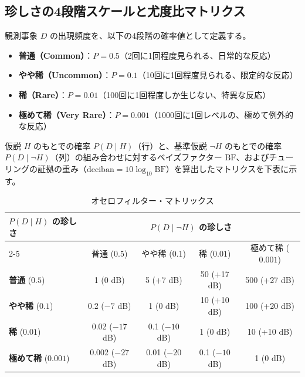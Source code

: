 \subsection{珍しさの4段階スケールと尤度比マトリクス}

観測事象 $D$ の出現頻度を、以下の4段階の確率値として定義する。
\begin{itemize}
\item \textbf{普通（Common）}：$P = 0.5$（2回に1回程度見られる、日常的な反応）
\item \textbf{やや稀（Uncommon）}：$P = 0.1$（10回に1回程度見られる、限定的な反応）
\item \textbf{稀（Rare）}：$P = 0.01$（100回に1回程度しか生じない、特異な反応）
\item \textbf{極めて稀（Very Rare）}：$P = 0.001$（1000回に1回レベルの、極めて例外的な反応）
\end{itemize}

仮説 $H$ のもとでの確率 $P(D \mid H)$（行）と、基準仮説 $\neg H$ のもとでの確率 $P(D \mid \neg H)$（列）の組み合わせに対するベイズファクター $\mathrm{BF}$、およびチューリングの証拠の重み（$\text{deciban} = 10 \log_{10} \mathrm{BF}$）を算出したマトリクスを下表に示す。
\begin{table}
  \centering
  \caption{オセロフィルター・マトリックス}
  \label{tab:othello_filter_matrix}
  \begin{tabular}{lcccc}
    \hline
    \multirow{2}{*}{$P(D \mid H)$ の珍しさ} & \multicolumn{4}{c}{$P(D \mid \neg H)$ の珍しさ} \\
    \cline{2-5}
    & 普通 ($0.5$) & やや稀 ($0.1$) & 稀 ($0.01$) & 極めて稀 ($0.001$) \\
    \hline
    \textbf{普通} ($0.5$)        & 1 (0 dB)       & 5 (+7 dB)     & 50 (+17 dB)  & 500 (+27 dB) \\
    \textbf{やや稀} ($0.1$)      & 0.2 ($-7$ dB)  & 1 (0 dB)      & 10 (+10 dB)  & 100 (+20 dB) \\
    \textbf{稀} ($0.01$)        & 0.02 ($-17$ dB) & 0.1 ($-10$ dB) & 1 (0 dB)     & 10 (+10 dB)  \\
    \textbf{極めて稀} ($0.001$)  & 0.002 ($-27$ dB) & 0.01 ($-20$ dB) & 0.1 ($-10$ dB) & 1 (0 dB)     \\
    \hline
  \end{tabular}
\end{table}

